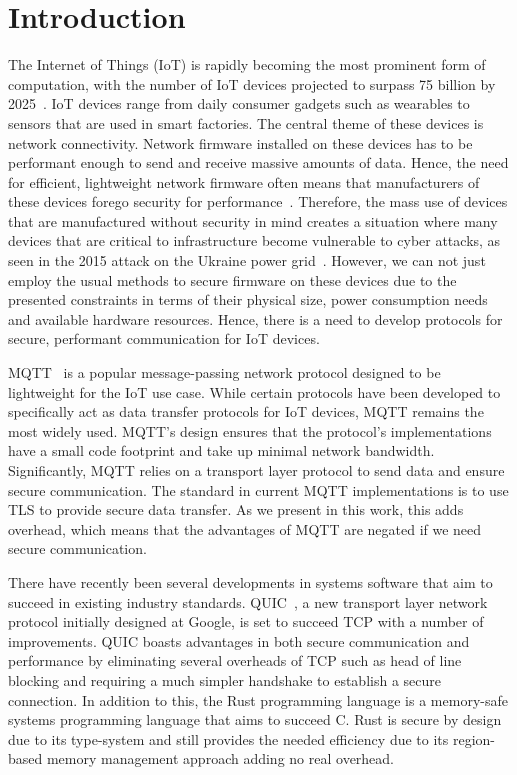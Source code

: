 \chapter{Introduction}


The Internet of Things (IoT) is rapidly becoming the most prominent form of computation, with the number of IoT devices projected to surpass 75 billion by 2025~\citep{statista_number_2016}.
IoT devices range from daily consumer gadgets such as wearables to sensors that are used in smart factories.
The central theme of these devices is network connectivity.
Network firmware installed on these devices has to be performant enough to send and receive massive amounts of data. 
Hence, the need for efficient, lightweight network firmware often means that manufacturers of these devices forego security for performance~\cite{ling_iot_2018}.
Therefore, the mass use of devices that are manufactured without security in mind creates a situation where many devices that are critical to infrastructure become vulnerable to cyber attacks, as seen in the 2015 attack on the Ukraine power grid~\citep{Liang2017}.
However, we can not just employ the usual methods to secure firmware on these devices due to the presented constraints in terms of their physical size, power consumption needs and available hardware resources.
Hence, there is a need to develop protocols for secure, performant communication for IoT devices.

MQTT~\citep{oasis_mqtt_2014} is a popular message-passing network protocol designed to be lightweight for the IoT use case.
While certain protocols have been developed to specifically act as data transfer protocols for IoT devices, MQTT remains the most widely used.
MQTT's design ensures that the protocol's implementations have a small code footprint and take up minimal network bandwidth.
Significantly, MQTT relies on a transport layer protocol to send data and ensure secure communication.
The standard in current MQTT implementations is to use TLS to provide secure data transfer.
As we present in this work, this adds overhead, which means that the advantages of MQTT are negated if we need secure communication.

There have recently been several developments in systems software that aim to succeed in existing industry standards.
QUIC~\citep{iyengar_quic_2021}, a new transport layer network protocol initially designed at Google, is set to succeed TCP with a number of improvements.
QUIC boasts advantages in both secure communication and performance by eliminating several overheads of TCP such as head of line blocking and requiring a much simpler handshake to establish a secure connection.
In addition to this, the Rust programming language is a memory-safe systems programming language that aims to succeed C.
Rust is secure by design due to its type-system and still provides the needed efficiency due to its region-based memory management approach adding no real overhead.

